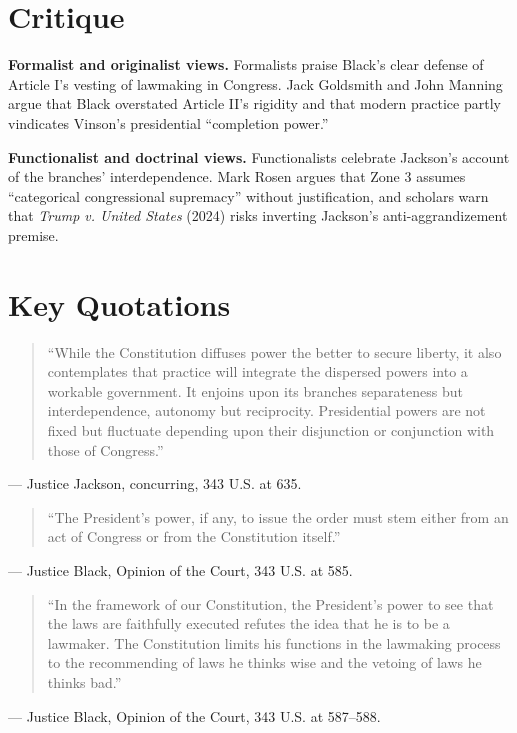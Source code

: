 \documentclass[12pt]{article}
\begin{document}
\section{Critique}

\textbf{Formalist and originalist views.} Formalists praise Black's clear defense of Article I's vesting of lawmaking in Congress. Jack Goldsmith and John Manning argue that Black overstated Article II's rigidity and that modern practice partly vindicates Vinson's presidential ``completion power.''

\textbf{Functionalist and doctrinal views.} Functionalists celebrate Jackson's account of the branches' interdependence. Mark Rosen argues that Zone 3 assumes ``categorical congressional supremacy'' without justification, and scholars warn that \textit{Trump v. United States} (2024) risks inverting Jackson's anti-aggrandizement premise.

\section{Key Quotations}

\begin{quote}
``While the Constitution diffuses power the better to secure liberty, it also contemplates that practice will integrate the dispersed powers into a workable government. It enjoins upon its branches separateness but interdependence, autonomy but reciprocity. Presidential powers are not fixed but fluctuate depending upon their disjunction or conjunction with those of Congress.''
\end{quote}
\noindent --- Justice Jackson, concurring, 343 U.S. at 635.

\begin{quote}
``The President's power, if any, to issue the order must stem either from an act of Congress or from the Constitution itself.''
\end{quote}
\noindent --- Justice Black, Opinion of the Court, 343 U.S. at 585.

\begin{quote}
``In the framework of our Constitution, the President's power to see that the laws are faithfully executed refutes the idea that he is to be a lawmaker. The Constitution limits his functions in the lawmaking process to the recommending of laws he thinks wise and the vetoing of laws he thinks bad.''
\end{quote}
\noindent --- Justice Black, Opinion of the Court, 343 U.S. at 587--588.
\end{document}
